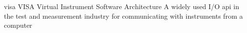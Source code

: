 \newglsXacronym%
{visa}%
{VISA}%
{Virtual Instrument Software Architecture}%
{A widely used I/O \gls{api} in the test and measurement industry for communicating with instruments from a computer}%